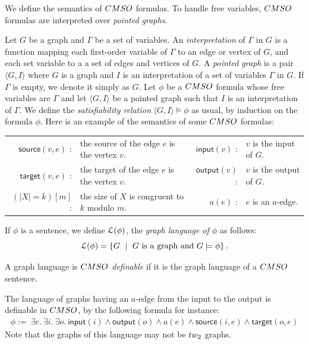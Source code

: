We define the semantics of $\CMSO$ formulas. To handle free variables, $\CMSO$ formulas are interpreted over \emph{pointed graphs}.

\begin{definition} Let $G$ be a graph and $\Gamma$ be a set of variables. An \emph{interpretation} of $\Gamma$ in $G$ is a function mapping each first-order variable of $\Gamma$ to an edge or vertex of $G$, and each set variable to a a set of edges and vertices of $G$. A \emph{pointed graph} is a pair  $\langle G,I\rangle$ where $G$ is a graph and $I$ is an interpretation of a set of variables $\Gamma$ in $G$. If $\Gamma$ is empty, we denote it simply as $G$.   Let $\phi$ be a $\CMSO$ formula whose free variables are $\Gamma$ and let $\langle G,I\rangle$ be a pointed graph such that $I$ is an interpretation of $\Gamma$.  We define the \emph{satisfiability relation} $\langle G, I\rangle\models \phi$ as usual, by induction on the formula $\phi$. Here is an example of the semantics of some $\CMSO$ formulas:
\medskip

\noindent \begin{tabular}{rlrl}
$\mathsf{source}(v,e)$ :& the source of the edge $e$ is the vertex $v$.\quad\qquad & $\mathsf{input}(v)$ : & $v$ is the input of $G$.\\
$\mathsf{target}(v,e)$ :& the target of the edge $e$ is the vertex $v$. &
$\mathsf{output}(v)$ : & $v$ is the output of $G$.\\
$(|X|=k)[m]$ :& the size of $X$ is congruent to $k$ modulo $m$.& $a(e)$ :  &  $e$ is an $a$-edge.  \\[7pt]
\end{tabular}
If $\phi$ is a sentence, we define $\mathcal L(\phi)$, the \emph{graph language of $\phi$} as  follows:
$$\mathcal L(\phi)=\left\{G \ \mid\ G \text{ is a graph and } G\models\phi\right\}.$$
\end{definition}

\begin{definition}\label{def:CMSO-def}
A graph language is \emph{$\CMSO$ definable} if it is the graph language of  a $\CMSO$ sentence. 
\end{definition}

\begin{example} \label{ex:mso-def}The language of graphs having an $a$-edge
from the input to the output is definable in $\CMSO$, by the following formula for instance:
\begin{align*}
\phi:=\ \exists e.\ \exists i.\ \exists o.\ \mathsf{input}(i) \wedge \mathsf{output}(o)
\wedge a(e) \wedge \mathsf{source}(i, e) \wedge \mathsf{target}(o,e)
\end{align*}
Note that the graphs of this language may not be $\TWT$ graphs. 
\end{example}

